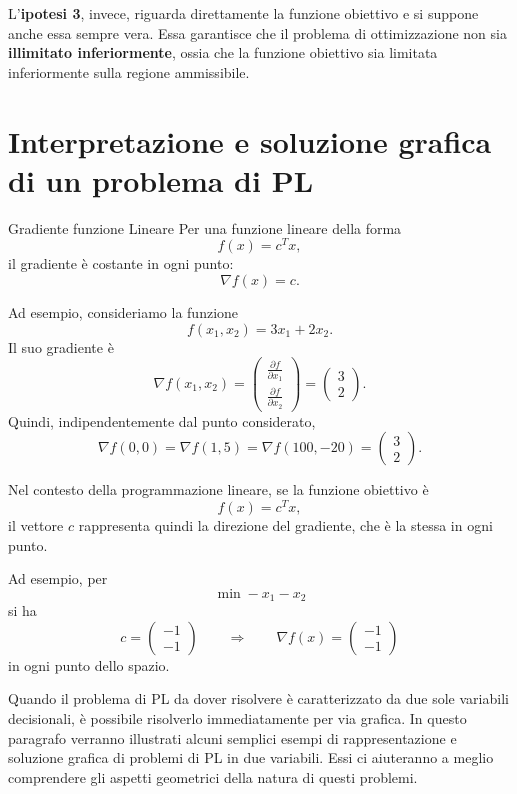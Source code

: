 L'\textbf{ipotesi 3}, invece, riguarda direttamente la funzione obiettivo e si suppone anche essa sempre vera. Essa garantisce che il problema di ottimizzazione non sia \textbf{illimitato inferiormente}, ossia che la funzione obiettivo sia limitata inferiormente sulla regione ammissibile.

\section{ Interpretazione e soluzione grafica di un problema di PL}
\begin{warning}{Gradiente funzione Lineare}
Per una funzione lineare della forma
\[
f(x) = c^T x,
\]
il gradiente è costante in ogni punto:
\[
\nabla f(x) = c.
\]

Ad esempio, consideriamo la funzione
\[
f(x_1,x_2) = 3x_1 + 2x_2.
\]
Il suo gradiente è
\[
\nabla f(x_1,x_2)
=
\begin{pmatrix}
\frac{\partial f}{\partial x_1}\\
\frac{\partial f}{\partial x_2}
\end{pmatrix}
=
\begin{pmatrix}
3\\
2
\end{pmatrix}.
\]
Quindi, indipendentemente dal punto considerato,
\[
\nabla f(0,0)
=
\nabla f(1,5)
=
\nabla f(100,-20)
=
\begin{pmatrix}
3\\
2
\end{pmatrix}.
\]

Nel contesto della programmazione lineare, se la funzione obiettivo è
\[
f(x) = c^T x,
\]
il vettore $c$ rappresenta quindi la direzione del gradiente, che è la stessa in ogni punto.

Ad esempio, per
\[
\min -x_1-x_2
\]
si ha
\[
c =
\begin{pmatrix}
-1\\
-1
\end{pmatrix}
\qquad\Longrightarrow\qquad
\nabla f(x) =
\begin{pmatrix}
-1\\
-1
\end{pmatrix}
\]
in ogni punto dello spazio.
\end{warning}

Quando il problema di PL da dover risolvere è caratterizzato da due sole
variabili decisionali, è possibile risolverlo immediatamente per via grafica.
In questo paragrafo verranno illustrati alcuni semplici esempi di rappresentazione e soluzione grafica di problemi di PL in due variabili. Essi ci
aiuteranno a meglio comprendere gli aspetti geometrici della natura di questi
problemi.

